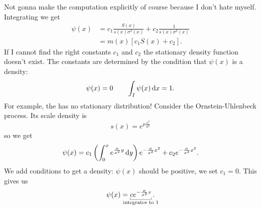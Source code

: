 \documentclass[12pt]{report}
\begin{document}
Not gonna make the computation explicitly of course because I don't hate myself. Integrating we get
\begin{align*}
	\psi(x)&=c_{1}\frac{S(x)}{s(x)\sigma^{2}(x)}+c_{2}\frac{1}{s(x)\sigma^{2}(x)}\\
	&=m(x)\left[c_{1}S(x)+c_{2}\right].
\end{align*}
If I cannot find the right constants $c_{1}$ and $c_{2}$ the stationary density function doesn't exist. The constants are determined by the condition that $\psi(x)$ is a density:
\begin{equation*}
	\psi(x)=0\qquad\int_{I}\psi(x)\mathop{}\!\mathrm{d} x=1.
\end{equation*}
For example, the \bwm{} has no stationary distribution! 
Consider the Ornstein-Uhlenbeck process. Its scale density is
\begin{equation*}
	s(x)=e^{\mu\frac{x^{2}}{\sigma^{2}}}
\end{equation*}
so we get
\begin{equation*}
	\psi(x)=c_{1}\left(\int_{0}^{x}e^{\frac{\mu}{\sigma^{2}}y}\mathop{}\!\mathrm{d} y\right)e^{-\frac{\mu}{\sigma^{2}}x^{2}}+c_{2}e^{-\frac{\mu}{\sigma^{2}}x^{2}}.
\end{equation*}
We add conditions to get a density: $\psi(x)$ should be positive, we set $c_{1}=0$. This gives us
\begin{equation*}
	\psi(x)=\ubracketthin{ce^{-\frac{\mu}{\sigma^{2}}x}}_{\claptext{integrates to 1}}.
\end{equation*}
\end{document}
